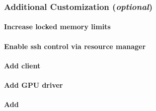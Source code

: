 \documentclass[letterpaper]{article}
\begin{document}


\subsubsection{Additional Customization ({\em optional})} \label{sec:addl_customizations}


\paragraph{Increase locked memory limits}


\paragraph{Enable ssh control via resource manager}


\paragraph{Add \Lustre{} client} \label{sec:lustre_client}




\vspace*{0.4cm}

\paragraph{Add GPU driver}


\paragraph{Add \clustershell{}}

\end{document}
